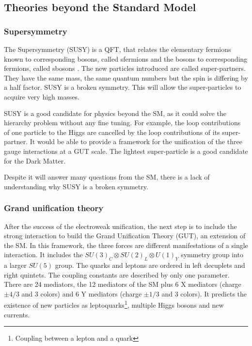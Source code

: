     \subsection{Theories beyond the Standard Model}

      \subsubsection{Supersymmetry}
    
      The Supersymmetry (SUSY) is a QFT, that relates the elementary fermions known to corresponding bosons, called sfermions and the bosons to corresponding fermions, called sbosons \cite{Signer2009}.
      The new particles introduced are called super-partners.
      They have the same mass, the same quantum numbers but the spin is differing by a half factor.
      SUSY is a broken symmetry. 
      This will allow the super-particles to acquire very high masses.

      SUSY is a good candidate for physics beyond the \gls{SM}, as it could solve the hierarchy problem without any fine tuning.
      For example, the loop contributions of one particle to the Higgs are cancelled by the loop contributions of its super-partner.
      It would be able to provide a framework for the unification of the three gauge interactions at a GUT scale.
      The lightest super-particle is a good candidate for the Dark Matter.

      Despite it will answer many questions from the \gls{SM}, there is a lack of understanding why SUSY is a broken symmetry.
      
      \subsubsection{Grand unification theory}
      
      After the success of the electroweak unification, the next step is to include the strong interaction to build the Grand Unification Theory (GUT), an extension of the \gls{SM}.
      In this framework, the three forces are different manifestations of a single interaction. 
      It includes the $SU(3)_C \otimes SU(2)_L \otimes U(1)_Y$ symmetry group into a larger $SU(5)$ group. 
      The quarks and leptons are ordered in left decuplets and right quintets.
      The coupling constants are described by only one parameter.  
      There are 24 mediators, the 12 mediators of the \gls{SM} plus 6 X mediators (charge $\pm4/3$ and 3 colors) and 6 Y mediators (charge $\pm1/3$ and 3 colors).
      It predicts the existence of new particles as leptoquarks\footnote{Coupling between a lepton and a quark}, multiple Higgs bosons and new currents.

